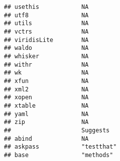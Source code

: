 \documentclass[
]{article}
\begin{document}
\begin{verbatim}
## usethis            NA                                        
## utf8               NA                                        
## utils              NA                                        
## vctrs              NA                                        
## viridisLite        NA                                        
## waldo              NA                                        
## whisker            NA                                        
## withr              NA                                        
## wk                 NA                                        
## xfun               NA                                        
## xml2               NA                                        
## xopen              NA                                        
## xtable             NA                                        
## yaml               NA                                        
## zip                NA                                        
##                    Suggests                                                                                                                                                                                                                                                                                                                                                                                                                                                                          
## abind              NA                                                                                                                                                                                                                                                                                                                                                                                                                                                                                
## askpass            "testthat"                                                                                                                                                                                                                                                                                                                                                                                                                                                                        
## base               "methods"                                                                                                                                                                                                                                                                                                                                                                                                                                                                         

\end{verbatim}
\end{document}
